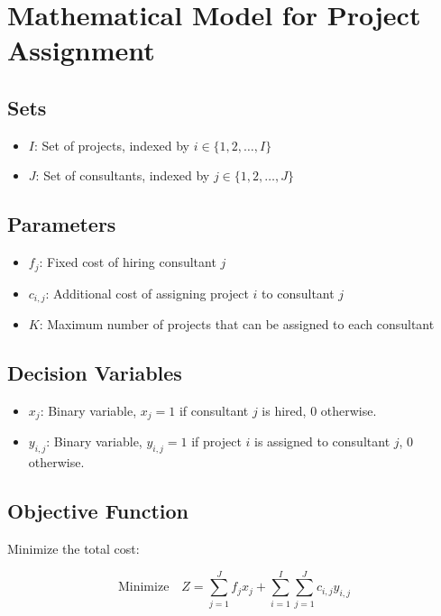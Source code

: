 \documentclass{article}
\begin{document}
\section*{Mathematical Model for Project Assignment}

\subsection*{Sets}
\begin{itemize}
    \item $I$: Set of projects, indexed by $i \in \{1, 2, \ldots, I\}$
    \item $J$: Set of consultants, indexed by $j \in \{1, 2, \ldots, J\}$
\end{itemize}

\subsection*{Parameters}
\begin{itemize}
    \item $f_j$: Fixed cost of hiring consultant $j$
    \item $c_{i,j}$: Additional cost of assigning project $i$ to consultant $j$
    \item $K$: Maximum number of projects that can be assigned to each consultant
\end{itemize}

\subsection*{Decision Variables}
\begin{itemize}
    \item $x_{j}$: Binary variable, $x_{j} = 1$ if consultant $j$ is hired, $0$ otherwise.
    \item $y_{i,j}$: Binary variable, $y_{i,j} = 1$ if project $i$ is assigned to consultant $j$, $0$ otherwise.
\end{itemize}

\subsection*{Objective Function}
Minimize the total cost:

\[
\text{Minimize} \quad Z = \sum_{j=1}^{J} f_j x_j + \sum_{i=1}^{I} \sum_{j=1}^{J} c_{i,j} y_{i,j}
\]
\end{document}
